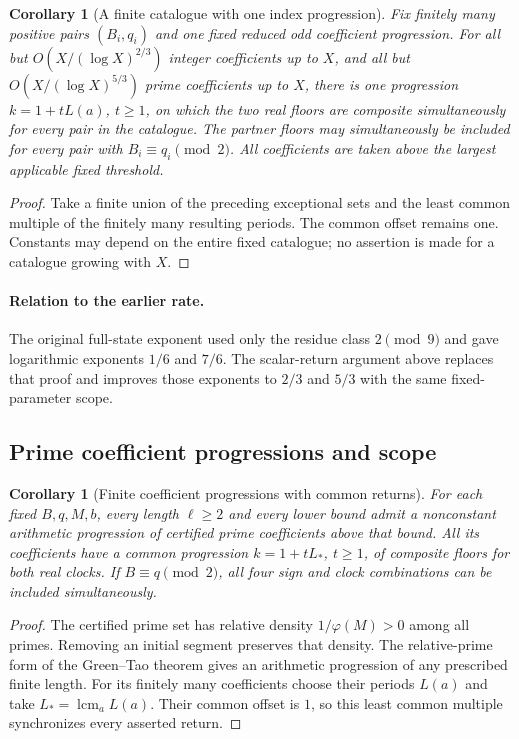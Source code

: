 \documentclass[11pt,a4paper]{article}
\newtheorem{corollary}[theorem]{Corollary}\newtheorem{mainthm}[theorem]{Theorem}
\theoremstyle{definition}\newtheorem{definition}[theorem]{Definition}
\theoremstyle{remark}\newtheorem{remark}[theorem]{Remark}
\DeclareMathOperator{\lcm}{lcm}\DeclareMathOperator{\disc}{disc}\DeclareMathOperator{\Res}{Res}
\begin{document}
\begin{corollary}[A finite catalogue with one index progression]
\label{R11:syn:projective-finite-catalogue}
Fix finitely many positive pairs $(B_i,q_i)$ and one fixed reduced odd
coefficient progression. For all but
$O(X/(\log X)^{2/3})$ integer coefficients up to $X$, and all but
$O(X/(\log X)^{5/3})$ prime coefficients up to $X$, there is one
progression $k=1+tL(a)$, $t\ge1$, on which the two real floors are
composite simultaneously for every pair in the catalogue.
The partner floors may simultaneously be included for every pair
with $B_i\equiv q_i\pmod2$. All coefficients are taken above the
largest applicable fixed threshold.
\end{corollary}
\begin{proof}
Take a finite union of the preceding exceptional sets and the least
common multiple of the finitely many resulting periods. The common
offset remains one. Constants may depend on the entire fixed catalogue;
no assertion is made for a catalogue growing with $X$.
\end{proof}

\paragraph{Relation to the earlier rate.} The original full-state exponent used only the residue class $2\pmod9$ and gave logarithmic exponents $1/6$ and $7/6$. The scalar-return argument above replaces that proof and improves those exponents to $2/3$ and $5/3$ with the same fixed-parameter scope.
\subsection{Prime coefficient progressions and scope}

\begin{corollary}[Finite coefficient progressions with common returns]
\label{R11:cor:GT}
For each fixed $B,q,M,b$, every length $\ell\ge2$ and every lower bound
admit a nonconstant arithmetic progression of certified prime
coefficients above that bound.
All its coefficients have a common progression
$k=1+tL_*$, $t\ge1$, of composite floors for both real clocks.
If $B\equiv q\pmod2$, all four sign and clock combinations can
be included simultaneously.
\end{corollary}

\begin{proof}
The certified prime set has relative density $1/\varphi(M)>0$
among all primes. Removing an initial segment preserves that density.
The relative-prime form of the Green--Tao theorem
\cite[Theorem~1.2]{GreenTao} gives an arithmetic progression of any
prescribed finite length.
For its finitely many coefficients choose their periods $L(a)$
and take $L_*=\lcm_a L(a)$. Their common offset is $1$,
so this least common multiple synchronizes every asserted return.
\end{proof}
\end{document}
